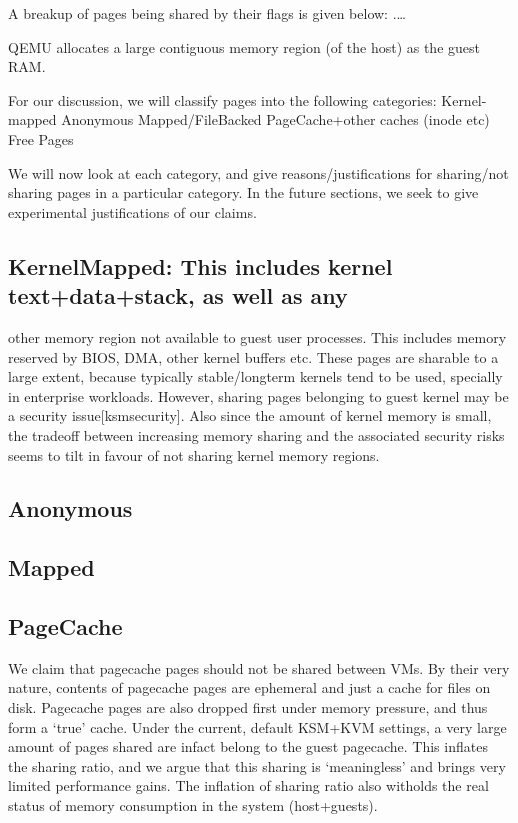 \documentclass[11pt]{article}
\begin{document}
A breakup of pages being shared by their flags is given below:
.\ldots{}

QEMU allocates a large contiguous memory region (of the host) as the
guest RAM.

For our discussion, we will classify pages into the following
categories:
Kernel-mapped
Anonymous
Mapped/FileBacked
PageCache+other caches (inode etc)
Free Pages

We will now look at each category, and give reasons/justifications for
sharing/not sharing pages in a particular category. In the future
sections, we seek to give experimental justifications of our claims.
\subsection{KernelMapped: This includes kernel text+data+stack, as well as any}
\label{sec-5_2}

other memory region not available to guest user processes. This includes
memory reserved by BIOS, DMA, other kernel buffers etc. 
These pages are sharable to a large extent, because typically
stable/longterm kernels tend to be used, specially in enterprise
workloads. 
However, sharing pages belonging to guest kernel may be a security
issue[ksmsecurity].
Also since the amount of kernel memory is small, the tradeoff between
increasing memory sharing and the associated security risks seems to
tilt in favour of not sharing kernel memory regions.
\subsection{Anonymous}
\label{sec-5_3}

    
\subsection{Mapped}
\label{sec-5_4}
\subsection{PageCache}
\label{sec-5_5}

We claim that pagecache pages should not be shared between VMs. By
their very nature, contents of pagecache pages are ephemeral and just
a cache for files on disk. Pagecache pages are also dropped first
under memory pressure, and thus form a `true' cache. Under the
current, default KSM+KVM settings, a very large amount of pages shared
are infact belong to the guest pagecache. This inflates the sharing
ratio, and we argue that this sharing is `meaningless' and brings very
limited performance gains. The inflation of sharing ratio also
witholds the real status of memory consumption in the system
(host+guests).
\end{document}
